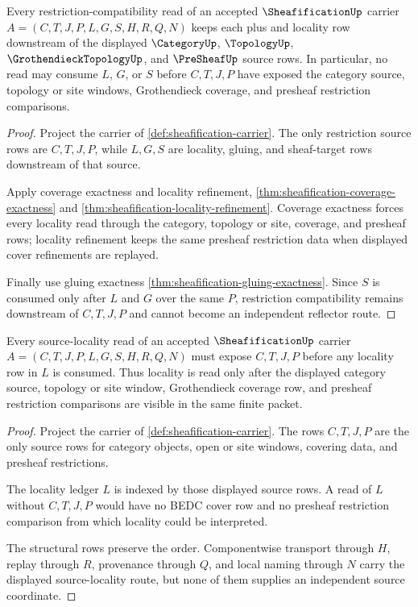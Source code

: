\begin{theorem}
\label{thm:sheafification-restriction-compatibility-obligation}
Every restriction-compatibility read of an accepted $\SheafificationUp$ carrier $A=(C,T,J,P,L,G,S,H,R,Q,N)$ keeps each plus and locality row downstream of the displayed $\CategoryUp$, $\TopologyUp$, $\GrothendieckTopologyUp$, and $\PreSheafUp$ source rows. In particular, no read may consume $L$, $G$, or $S$ before $C,T,J,P$ have exposed the category source, topology or site windows, Grothendieck coverage, and presheaf restriction comparisons.
\end{theorem}
\begin{proof}
Project the carrier of \autoref{def:sheafification-carrier}. The only restriction source rows are $C,T,J,P$, while $L,G,S$ are locality, gluing, and sheaf-target rows downstream of that source.

Apply coverage exactness and locality refinement, \autoref{thm:sheafification-coverage-exactness} and \autoref{thm:sheafification-locality-refinement}. Coverage exactness forces every locality read through the category, topology or site, coverage, and presheaf rows; locality refinement keeps the same presheaf restriction data when displayed cover refinements are replayed.

Finally use gluing exactness \autoref{thm:sheafification-gluing-exactness}. Since $S$ is consumed only after $L$ and $G$ over the same $P$, restriction compatibility remains downstream of $C,T,J,P$ and cannot become an independent reflector route.
\end{proof}

\begin{theorem}
\label{thm:sheafification-source-locality-obligation}
Every source-locality read of an accepted $\SheafificationUp$ carrier $A=(C,T,J,P,L,G,S,H,R,Q,N)$ must expose $C,T,J,P$ before any locality row in $L$ is consumed. Thus locality is read only after the displayed category source, topology or site window, Grothendieck coverage row, and presheaf restriction comparisons are visible in the same finite packet.
\end{theorem}
\begin{proof}
Project the carrier of \autoref{def:sheafification-carrier}. The rows $C,T,J,P$ are the only source rows for category objects, open or site windows, covering data, and presheaf restrictions.

The locality ledger $L$ is indexed by those displayed source rows. A read of $L$ without $C,T,J,P$ would have no BEDC cover row and no presheaf restriction comparison from which locality could be interpreted.

The structural rows preserve the order. Componentwise transport through $H$, replay through $R$, provenance through $Q$, and local naming through $N$ carry the displayed source-locality route, but none of them supplies an independent source coordinate.
\end{proof}

